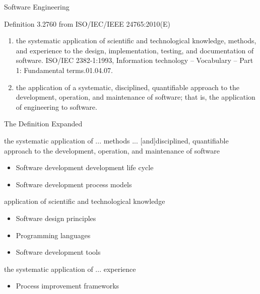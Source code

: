 \documentclass{beamer}
\author[Chris Simpkins] 
{Christopher Simpkins \\\texttt{chris.simpkins@gatech.edu}}
\institute[Georgia Tech] %
\date[CS 1331]{}
\begin{document}
\begin{frame}
  \titlepage
\end{frame}



\begin{frame}[fragile]{Software Engineering}


Definition 3.2760 from ISO/IEC/IEEE 24765:2010(E)
\begin{enumerate}
\item the systematic application of scientific and technological knowledge, methods, and experience to the design, implementation, testing, and documentation of software. ISO/IEC 2382-1:1993, Information technology -- Vocabulary -- Part 1: Fundamental terms.01.04.07.
\item the application of a systematic, disciplined, quantifiable approach to the development, operation, and maintenance of software; that is, the application of engineering to software.
\end{enumerate}


\end{frame}

\begin{frame}[fragile]{The Definition Expanded}


the systematic application of ... methods ... [and]disciplined, quantifiable approach to the development, operation, and maintenance of software
\begin{itemize}
\item Software development development life cycle
\item Software development process models
\end{itemize}

application of scientific and technological knowledge
\begin{itemize}
\item Software design principles
\item Programming languages
\item Software development tools
\end{itemize}

the systematic application of ... experience
\begin{itemize}
\item Process improvement frameworks
\end{itemize}


\end{frame}
\end{document}
